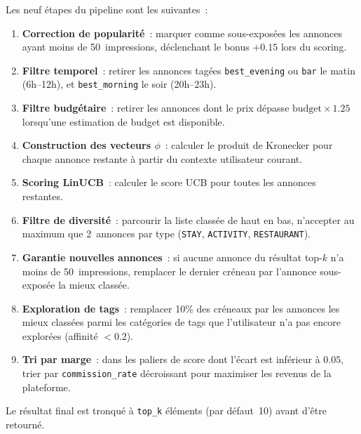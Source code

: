 Les neuf étapes du pipeline sont les suivantes~:

\begin{enumerate}[leftmargin=2cm]
    \item \textbf{Correction de popularité}~: marquer comme sous-exposées les annonces ayant
    moins de 50~impressions, déclenchant le bonus $+0.15$ lors du scoring.

    \item \textbf{Filtre temporel}~: retirer les annonces tagées \texttt{best\_evening} ou
    \texttt{bar} le matin (6h--12h), et \texttt{best\_morning} le soir (20h--23h).

    \item \textbf{Filtre budgétaire}~: retirer les annonces dont le prix dépasse
    $\text{budget} \times 1.25$ lorsqu'une estimation de budget est disponible.

    \item \textbf{Construction des vecteurs $\phi$}~: calculer le produit de Kronecker pour chaque
    annonce restante à partir du contexte utilisateur courant.

    \item \textbf{Scoring LinUCB}~: calculer le score UCB pour toutes les annonces restantes.

    \item \textbf{Filtre de diversité}~: parcourir la liste classée de haut en bas, n'accepter
    au maximum que 2~annonces par type (\texttt{STAY}, \texttt{ACTIVITY}, \texttt{RESTAURANT}).

    \item \textbf{Garantie nouvelles annonces}~: si aucune annonce du résultat top-$k$ n'a moins
    de 50~impressions, remplacer le dernier créneau par l'annonce sous-exposée la mieux classée.

    \item \textbf{Exploration de tags}~: remplacer 10\% des créneaux par les annonces les mieux
    classées parmi les catégories de tags que l'utilisateur n'a pas encore explorées
    (affinité $< 0.2$).

    \item \textbf{Tri par marge}~: dans les paliers de score dont l'écart est inférieur à $0.05$,
    trier par \texttt{commission\_rate} décroissant pour maximiser les revenus de la plateforme.
\end{enumerate}

Le résultat final est tronqué à \texttt{top\_k} éléments (par défaut~10) avant d'être retourné.


